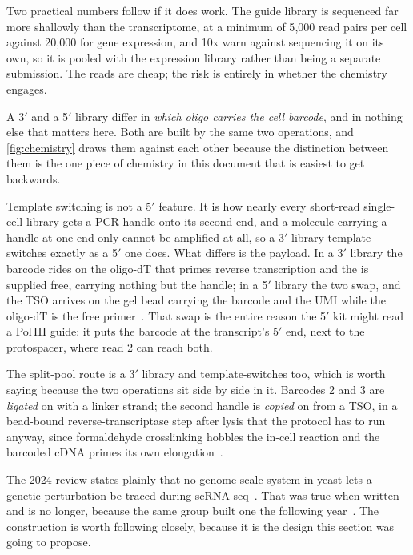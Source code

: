 Two practical numbers follow if it does work. The guide library is sequenced far
more shallowly than the transcriptome, at a minimum of 5{,}000 read pairs per
cell against 20{,}000 for gene expression, and 10x warn against sequencing it on
its own, so it is pooled with the expression library
rather than being a separate submission. The reads are cheap; the risk is
entirely in whether the chemistry engages.

 A 3$'$ and a 5$'$ library differ in \emph{which oligo carries the cell
barcode}, and in nothing else that matters here. Both are built by the same two
operations, and \cref{fig:chemistry} draws them against each other because the
distinction between them is the one piece of chemistry in this document that is
easiest to get backwards.

Template switching is not a 5$'$ feature. It is how nearly every short-read
single-cell library gets a PCR handle onto its second end, and a molecule
carrying a handle at one end only cannot be amplified at all, so a 3$'$ library
template-switches exactly as a 5$'$ one does. What differs is the payload. In a
3$'$ library the barcode rides on the oligo-dT that primes reverse transcription
and the  is supplied free, carrying nothing but
the handle; in a 5$'$ library the two swap, and the TSO arrives on the gel bead
carrying the barcode and the UMI while the oligo-dT is the free
primer~\citep{nadal-ribellesRiseSinglecellTranscriptomics2024}. That swap is the
entire reason the 5$'$ kit might read a Pol\,III guide: it puts the barcode at
the transcript's 5$'$ end, next to the protospacer, where read 2 can reach both.

The split-pool route is a 3$'$ library and template-switches too, which is worth
saying because the two operations sit side by side in it. Barcodes 2 and 3 are
\emph{ligated} on with a linker strand; the second handle is \emph{copied} on
from a TSO, in a bead-bound reverse-transcriptase step after lysis that the
protocol has to run anyway, since formaldehyde crosslinking hobbles the in-cell
reaction and the barcoded cDNA primes its own
elongation~\citep{gaisserHighthroughputSinglecellTranscriptomics2024,brettnerUltraHighthroughputMassively2024}.

 The 2024
review states plainly that no genome-scale system in yeast lets a genetic
perturbation be traced during
scRNA-seq~\citep{nadal-ribellesRiseSinglecellTranscriptomics2024}. That was true
when written and is no longer, because the same group built one the following
year~\citep{nadal-ribellesSinglecellResolvedGenotypephenotype2025}. The
construction is worth following closely, because it is the design this section
was going to propose.

